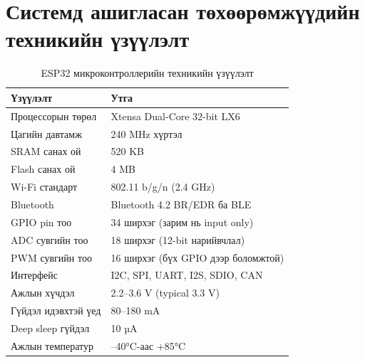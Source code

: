\documentclass[12pt,a4paper]{report}
\begin{document}
\section{Системд ашигласан төхөөрөмжүүдийн техникийн үзүүлэлт}

\begin{table}[H]
\centering
\scriptsize
\caption{ESP32 микроконтроллерийн техникийн үзүүлэлт}
\label{tab:esp32-spec}
\begin{tabularx}{\textwidth}{|X|X|}
\hline
\textbf{Үзүүлэлт} & \textbf{Утга} \\ \hline
Процессорын төрөл       & Xtensa Dual-Core 32-bit LX6 \\ \hline
Цагийн давтамж          & 240 MHz хүртэл \\ \hline
SRAM санах ой           & 520 KB \\ \hline
Flash санах ой          & 4 MB \\ \hline
Wi-Fi стандарт          & 802.11 b/g/n (2.4 GHz) \\ \hline
Bluetooth               & Bluetooth 4.2 BR/EDR ба BLE \\ \hline
GPIO pin тоо            & 34 ширхэг (зарим нь input only) \\ \hline
ADC сувгийн тоо         & 18 ширхэг (12-bit нарийвчлал) \\ \hline
PWM сувгийн тоо         & 16 ширхэг (бүх GPIO дээр боломжтой) \\ \hline
Интерфейс               & I2C, SPI, UART, I2S, SDIO, CAN \\ \hline
Ажлын хүчдэл            & 2.2--3.6 V (typical 3.3 V) \\ \hline
Гүйдэл идэвхтэй үед     & 80--180 mA \\ \hline
Deep sleep гүйдэл       & 10 µA \\ \hline
Ажлын температур        & --40°C-аас +85°C \\ \hline
\end{tabularx}
\end{table}
\end{document}
